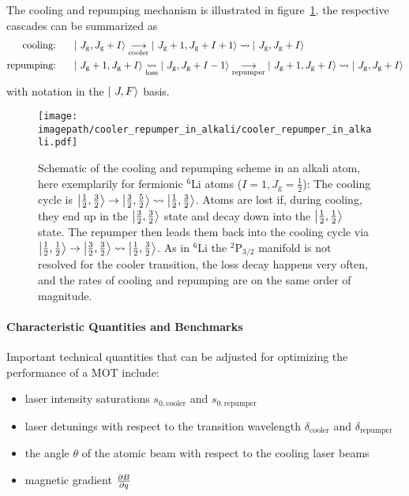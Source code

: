 The cooling and repumping mechanism is illustrated in figure~\ref{fig:cooler_repumper_in_alkali}, the respective cascades can be summarized as
\begin{align}
    \label{eq:cooler_cascade}\text{cooling:}~~~~~ & \Ket{~J_\text{g},J_\text{g} + I} \underset{\text{cooler}}{\longrightarrow} \Ket{~J_\text{g} + 1, J_\text{g} + I + 1} \rightsquigarrow  \Ket{~J_\text{g}, J_\text{g} + I}\\
    \label{eq:repumper_cascade}\text{repumping:}~~~~~ & \Ket{~J_\text{g} + 1, J_\text{g} + I} \underset{\text{loss}}{\rightsquigarrow} \Ket{~J_\text{g}, J_\text{g} + I - 1}  \underset{\text{repumper}}{\longrightarrow} \Ket{~J_\text{g} + 1, J_\text{g} + I} \rightsquigarrow  \Ket{~J_\text{g}, J_\text{g} + I}
\end{align}
with notation in the $\Ket{~J, F}$ basis.

\begin{figure}
    \centering
    \texttt{[image: \\imagepath/cooler\_repumper\_in\_alkali/cooler\_repumper\_in\_alkali.pdf]}
    \caption{Schematic of the cooling and repumping scheme in an alkali atom, here exemplarily for fermionic $^6$Li atoms ($I = 1, J_\text{g} = \frac{1}{2}$): The cooling cycle is $\Ket{\frac{1}{2}, \frac{3}{2}} \rightarrow \Ket{\frac{3}{2}, \frac{5}{2}} \rightsquigarrow \Ket{\frac{1}{2}, \frac{3}{2}}$. Atoms are lost if, during cooling, they end up in the $\Ket{\frac{3}{2}, \frac{3}{2}}$ state and decay down into the $\Ket{\frac{1}{2}, \frac{1}{2}}$ state. The repumper then leads them back into the cooling cycle via $\Ket{\frac{1}{2}, \frac{1}{2}} \rightarrow \Ket{\frac{3}{2}, \frac{3}{2}} \rightsquigarrow \Ket{\frac{1}{2}, \frac{3}{2}}$. As in $^6$Li the $^2\text{P}_{3/2}$ manifold is not resolved for the cooler transition, the loss decay happens very often, and the rates of cooling and repumping are on the same order of magnitude.}
    \label{fig:cooler_repumper_in_alkali}
\end{figure}

\paragraph{Characteristic Quantities and Benchmarks}
Important technical quantities that can be adjusted for optimizing the performance of a MOT include:
\begin{itemize}
    \item laser intensity saturations $s_{0, \text{cooler}}$ and $s_{0, \text{repumper}}$
    \item laser detunings with respect to the transition wavelength $\delta_\text{cooler}$ and $\delta_\text{repumper}$
    \item the angle $\theta$ of the atomic beam with respect to the cooling laser beams
    \item magnetic gradient $\pdv{B}{q}$
\end{itemize}

